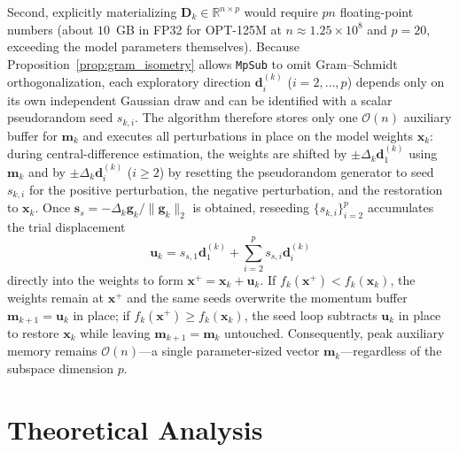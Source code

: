 \documentclass[smallextended]{svjour3}
\newcommand{\bx}{\bm{x}}
\newcommand{\bd}{\bm{d}}
\newcommand{\bg}{\bm{g}}
\newcommand{\bs}{\bm{s}}
\begin{document}
Second, explicitly materializing $\bm D_k \in \mathbb{R}^{n \times p}$ would require $pn$ floating-point numbers (about $10$~GB in FP32 for OPT-125M at $n \approx 1.25 \times 10^8$ and $p = 20$, exceeding the model parameters themselves). Because Proposition~\ref{prop:gram_isometry} allows \texttt{MpSub} to omit Gram--Schmidt orthogonalization, each exploratory direction $\bd_i^{(k)}$ ($i = 2, \ldots, p$) depends only on its own independent Gaussian draw and can be identified with a scalar pseudorandom seed $s_{k,i}$. The algorithm therefore stores only one $\mathcal{O}(n)$ auxiliary buffer for $\bm m_k$ and executes all perturbations in place on the model weights $\bx_k$: during central-difference estimation, the weights are shifted by $\pm \Delta_k \bd_1^{(k)}$ using $\bm m_k$ and by $\pm \Delta_k \bd_i^{(k)}$ ($i \ge 2$) by resetting the pseudorandom generator to seed $s_{k,i}$ for the positive perturbation, the negative perturbation, and the restoration to $\bx_k$. Once $\bs_s = -\Delta_k \bg_k / \|\bg_k\|_2$ is obtained, reseeding $\{s_{k,i}\}_{i=2}^p$ accumulates the trial displacement
\[
\bm u_k = s_{s,1} \bd_1^{(k)} + \sum_{i=2}^p s_{s,i} \bd_i^{(k)}
\]
directly into the weights to form $\bx^+ = \bx_k + \bm u_k$. If $f_k(\bx^+) < f_k(\bx_k)$, the weights remain at $\bx^+$ and the same seeds overwrite the momentum buffer $\bm m_{k+1} = \bm u_k$ in place; if $f_k(\bx^+) \ge f_k(\bx_k)$, the seed loop subtracts $\bm u_k$ in place to restore $\bx_k$ while leaving $\bm m_{k+1} = \bm m_k$ untouched. Consequently, peak auxiliary memory remains $\mathcal{O}(n)$---a single parameter-sized vector $\bm m_k$---regardless of the subspace dimension $p$.

\section{Theoretical Analysis}
\label{sec:analysis}
\end{document}
